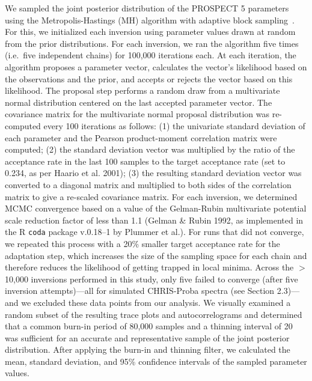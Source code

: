 We sampled the joint posterior distribution of the PROSPECT 5 parameters using the Metropolis-Hastings (MH) algorithm with adaptive block sampling~\cite{haario_2001_adaptive}.
For this, we initialized each inversion using parameter values drawn at random from the prior distributions.
For each inversion, we ran the algorithm five times (i.e.\ five independent chains) for 100,000 iterations each.
At each iteration, the algorithm proposes a parameter vector, calculates the vector's likelihood based on the observations and the prior, and accepts or rejects the vector based on this likelihood.
The proposal step performs a random draw from a multivariate normal distribution centered on the last accepted parameter vector.
The covariance matrix for the multivariate normal proposal distribution was re-computed every 100 iterations as follows:
(1) the univariate standard deviation of each parameter and the Pearson product-moment correlation matrix were computed;
(2) the standard deviation vector was multiplied by the ratio of the acceptance rate in the last 100 samples to the target acceptance rate (set to 0.234, as per Haario et al. 2001);
(3) the resulting standard deviation vector was converted to a diagonal matrix and multiplied to both sides of the correlation matrix to give a re-scaled covariance matrix. 
For each inversion, we determined MCMC convergence based on a value of the Gelman-Rubin multivariate potential scale reduction factor of less than 1.1 (Gelman \& Rubin 1992, as implemented in the R \texttt{coda} package v.0.18--1 by Plummer et al.). \nocite{gelman_1992_inference,r_coda}
For runs that did not converge, we repeated this process with a 20\% smaller target acceptance rate for the adaptation step, which increases the size of the sampling space for each chain and therefore reduces the likelihood of getting trapped in local minima. 
Across the $>$10,000 inversions performed in this study, only five failed to converge (after five inversion attempts)---all for simulated CHRIS-Proba spectra (see Section 2.3)---and we excluded these data points from our analysis. %
We visually examined a random subset of the resulting trace plots and autocorrelograms and determined that a common burn-in period of 80,000 samples and a thinning interval of 20 was sufficient for an accurate and representative sample of the joint posterior distribution.
After applying the burn-in and thinning filter, we calculated the mean, standard deviation, and 95\% confidence intervals of the sampled parameter values. %

